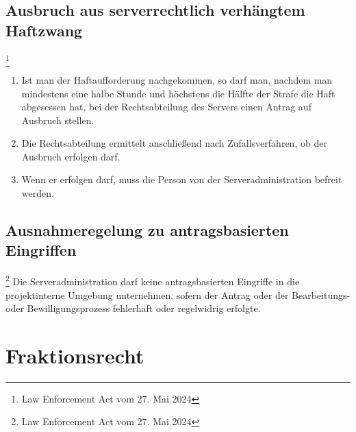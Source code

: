 \documentclass{article}
\begin{document}
\subsection{Ausbruch aus serverrechtlich verhängtem Haftzwang}\footnote{Law Enforcement Act vom 27. Mai 2024}
\begin{enumerate}[(1)]
	\item Ist man der Haftaufforderung nachgekommen, so darf man, nachdem man mindestens eine halbe Stunde und höchstens die Hälfte der Strafe die Haft abgesessen hat,
	bei der Rechtsabteilung des Servers einen Antrag auf Ausbruch stellen.
	\item Die Rechtsabteilung ermittelt anschließend nach Zufallsverfahren, ob der Ausbruch erfolgen darf.
	\item Wenn er erfolgen darf, muss die Person von der Serveradministration befreit werden.
\end{enumerate}

\subsection{Ausnahmeregelung zu antragsbasierten Eingriffen}\footnote{Law Enforcement Act vom 27. Mai 2024}
Die Serveradministration darf keine antragsbasierten Eingriffe in die projektinterne Umgebung unternehmen, sofern der Antrag oder der Bearbeitungs- oder Bewilligungsprozess
fehlerhaft oder regelwidrig erfolgte.

\section{Fraktionsrecht}
\end{document}

